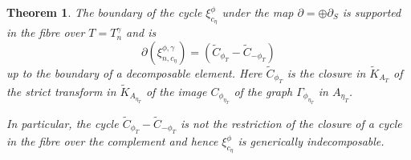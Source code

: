 \documentclass[11pt,a4paper]{article}
\newtheorem{thm}[defn]{Theorem}
\newcommand {\TK}{{\tilde{K}}}
\newcommand{\TC}{\tilde{C}}
\begin{document}
\begin{thm} The boundary of the cycle $\xi^{\phi}_{c_{\eta}}$ under the map $\partial=\oplus \partial_S$ is supported in the fibre over $T=T_n^{\gamma}$ and is 
		$$\partial (\xi^{\phi,\gamma}_{n,c_{\eta}})=(\TC_{\phi_T} -\TC_{-\phi_T})$$
%	
up to the boundary of a decomposable element. Here $\TC_{\phi_T}$ is the closure in $\TK_{A_T}$ of  the strict transform  in $\TK_{A_{\eta_T}}$ of the  image $C_{\phi_{\eta_T}}$ of the graph $\Gamma_{\phi_{\eta_T}}$ in $A_{\eta_T}$.

In particular, the cycle $\TC_{\phi_T} -\TC_{-\phi_T}$ is not the restriction of the closure of a  cycle in the fibre over the complement and  hence  $\xi_{c_{\eta}}^{\phi}$ is generically {\em indecomposable}.
\label{mainthm}
	
\end{thm}
\end{document}
